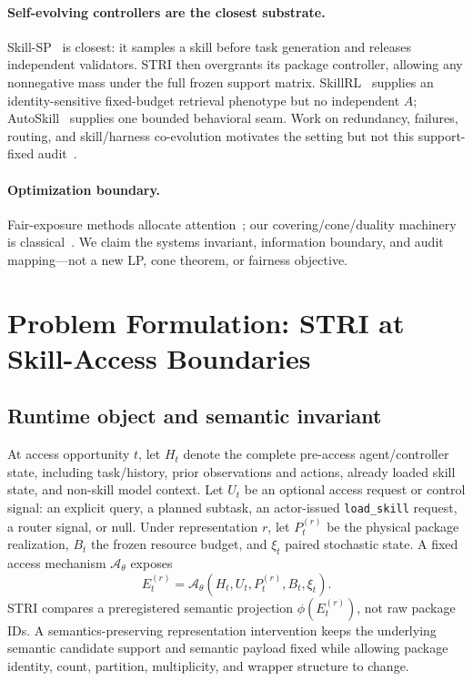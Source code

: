 \paragraph{Self-evolving controllers are the closest substrate.}
Skill-SP~\citep{huang2026skill} is closest: it samples a skill before task generation and releases independent validators. STRI then overgrants its package controller, allowing any nonnegative mass under the full frozen support matrix. SkillRL~\citep{xia2026skillrl} supplies an identity-sensitive fixed-budget retrieval phenotype but no independent $A$; AutoSkill~\citep{yang2026autoskill} supplies one bounded behavioral seam. Work on redundancy, failures, routing, and skill/harness co-evolution motivates the setting but not this support-fixed audit~\citep{zhu2026skillclone,liu2026skillsvote,mao2026practiceunsafe,dong2026agentskills,chen2026erskill,wang2026shaper}.

\paragraph{Optimization boundary.}
Fair-exposure methods allocate attention~\citep{singh2018fairness,biega2018equity}; our covering/cone/duality machinery is classical~\citep{lovasz1975fractional,sinkhorn1967nonnegative,radunovic2007fairness,beck1981integer,boyd2004convex}. We claim the systems invariant, information boundary, and audit mapping---not a new LP, cone theorem, or fairness objective.

\section{Problem Formulation: STRI at Skill-Access Boundaries}
\label{sec:formalism}

\subsection{Runtime object and semantic invariant}
At access opportunity $t$, let $H_t$ denote the complete pre-access agent/controller state, including task/history, prior observations and actions, already loaded skill state, and non-skill model context. Let $U_t$ be an optional access request or control signal: an explicit query, a planned subtask, an actor-issued \texttt{load\_skill} request, a router signal, or null. Under representation $r$, let $P_t^{(r)}$ be the physical package realization, $B_t$ the frozen resource budget, and $\xi_t$ paired stochastic state. A fixed access mechanism $\mathcal A_\theta$ exposes
\[
E_t^{(r)}=\mathcal A_\theta(H_t,U_t,P_t^{(r)},B_t,\xi_t).
\]
STRI compares a preregistered semantic projection $\phi(E_t^{(r)})$, not raw package IDs. A semantics-preserving representation intervention keeps the underlying semantic candidate support and semantic payload fixed while allowing package identity, count, partition, multiplicity, and wrapper structure to change.

